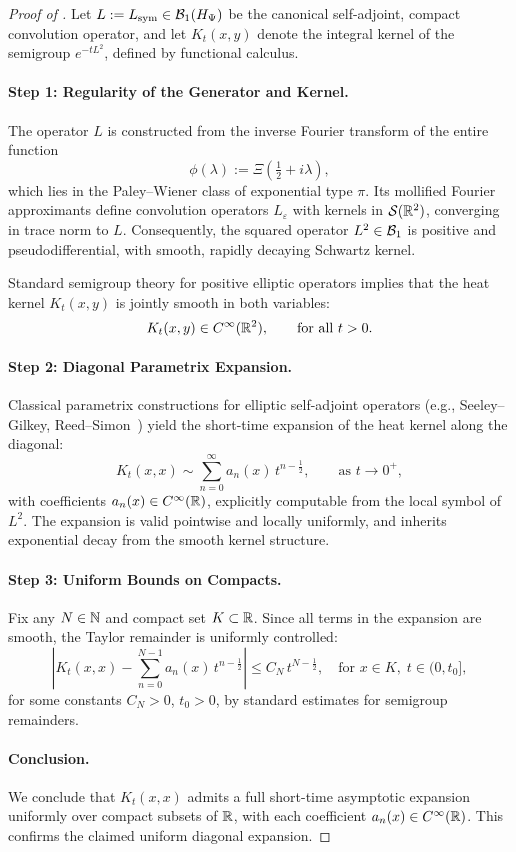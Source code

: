\begin{proof}[Proof of ]
Let \( L := L_{\mathrm{sym}} \in \mathcal{B}_1(H_{\Psi}) \) be the canonical self-adjoint, compact convolution operator, and let \( K_t(x,y) \) denote the integral kernel of the semigroup \( e^{-tL^2} \), defined by functional calculus.

\paragraph{Step 1: Regularity of the Generator and Kernel.}
The operator \( L \) is constructed from the inverse Fourier transform of the entire function
\[
\phi(\lambda) := \Xi\left(\tfrac{1}{2} + i\lambda\right),
\]
which lies in the Paley--Wiener class of exponential type \( \pi \). Its mollified Fourier approximants define convolution operators \( L_\varepsilon \) with kernels in \( \mathcal{S}(\mathbb{R}^2) \), converging in trace norm to \( L \). Consequently, the squared operator \( L^2 \in \mathcal{B}_1 \) is positive and pseudodifferential, with smooth, rapidly decaying Schwartz kernel.

Standard semigroup theory for positive elliptic operators implies that the heat kernel \( K_t(x,y) \) is jointly smooth in both variables:
\[
K_t(x,y) \in C^\infty(\mathbb{R}^2), \qquad \text{for all } t > 0.
\]

\paragraph{Step 2: Diagonal Parametrix Expansion.}
Classical parametrix constructions for elliptic self-adjoint operators (e.g., Seeley--Gilkey, Reed--Simon~\cite{ReedSimon1978IV}) yield the short-time expansion of the heat kernel along the diagonal:
\[
K_t(x,x) \sim \sum_{n=0}^\infty a_n(x) \, t^{n - \frac{1}{2}}, \qquad \text{as } t \to 0^+,
\]
with coefficients \( a_n(x) \in C^\infty(\mathbb{R}) \), explicitly computable from the local symbol of \( L^2 \). The expansion is valid pointwise and locally uniformly, and inherits exponential decay from the smooth kernel structure.

\paragraph{Step 3: Uniform Bounds on Compacts.}
Fix any \( N \in \mathbb{N} \) and compact set \( K \subset \mathbb{R} \). Since all terms in the expansion are smooth, the Taylor remainder is uniformly controlled:
\[
\left| K_t(x,x) - \sum_{n=0}^{N-1} a_n(x)\, t^{n - \frac{1}{2}} \right| \le C_N\, t^{N - \frac{1}{2}}, \quad \text{for } x \in K, \; t \in (0, t_0],
\]
for some constants \( C_N > 0 \), \( t_0 > 0 \), by standard estimates for semigroup remainders.

\paragraph{Conclusion.}
We conclude that \( K_t(x,x) \) admits a full short-time asymptotic expansion uniformly over compact subsets of \( \mathbb{R} \), with each coefficient \( a_n(x) \in C^\infty(\mathbb{R}) \). This confirms the claimed uniform diagonal expansion.
\end{proof}
